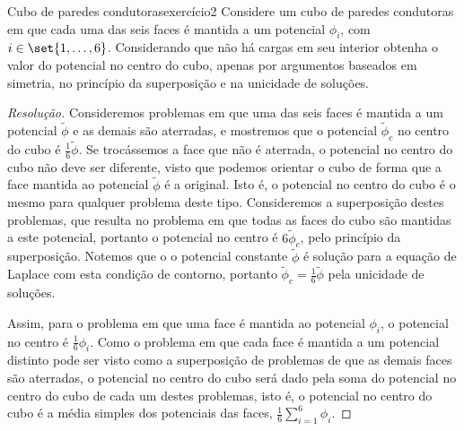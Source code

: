 \begin{exercício}{Cubo de paredes condutoras}{exercício2}
    Considere um cubo de paredes condutoras em que cada uma das seis faces é mantida a um potencial \(\phi_i\), com \(i \in \set{1,\dots, 6}\). Considerando que não há cargas em seu interior obtenha o valor do potencial no centro do cubo, apenas por argumentos baseados em simetria, no princípio da superposição e na unicidade de soluções.
\end{exercício}
\begin{proof}[Resolução]
    Consideremos problemas em que uma das seis faces é mantida a um potencial \(\tilde{\phi}\) e as demais são aterradas, e mostremos que o potencial \(\tilde{\phi}_c\) no centro do cubo é \(\frac16\tilde{\phi}\). Se trocássemos a face que não é aterrada, o potencial no centro do cubo não deve ser diferente, visto que podemos orientar o cubo de forma que a face mantida ao potencial \(\tilde{\phi}\) é a original. Isto é, o potencial no centro do cubo é o mesmo para qualquer problema deste tipo. Consideremos a superposição destes problemas, que resulta no problema em que todas as faces do cubo são mantidas a este potencial, portanto o potencial no centro é \(6\tilde{\phi}_c\), pelo princípio da superposição. Notemos que o o potencial constante \(\tilde{\phi}\) é solução para a equação de Laplace com esta condição de contorno, portanto \(\tilde{\phi}_c = \frac16 \tilde{\phi}\) pela unicidade de soluções.

    Assim, para o problema em que uma face é mantida ao potencial \(\phi_i\), o potencial no centro é \(\frac{1}{6}\phi_i\). Como o problema em que cada face é mantida a um potencial distinto pode ser visto como a superposição de problemas de que as demais faces são aterradas, o potencial no centro do cubo será dado pela soma do potencial no centro do cubo de cada um destes problemas, isto é, o potencial no centro do cubo é a média simples dos potenciais das faces, \(\frac16 \sum_{i=1}^6 \phi_i\).
\end{proof}
